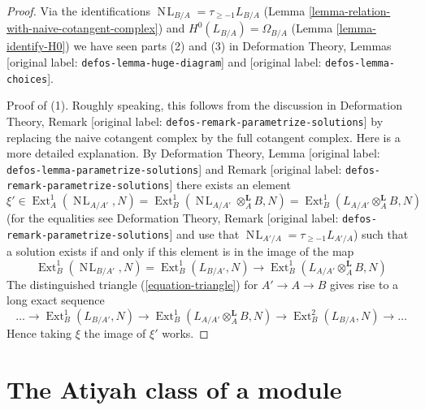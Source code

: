 \documentclass[10pt,a4paper]{article}
\theoremstyle{plain}
\theoremstyle{definition}
\theoremstyle{remark}
\numberwithin{equation}{subsection}
\def\Ext{\mathop{\mathrm{Ext}}\nolimits}
\def\NL{\mathop{N\!L}\nolimits}
\begin{document}
\begin{proof}
Via the identifications $\NL_{B/A} = \tau_{\geq -1}L_{B/A}$
(Lemma \ref{lemma-relation-with-naive-cotangent-complex}) and
$H^0(L_{B/A}) = \Omega_{B/A}$ (Lemma \ref{lemma-identify-H0})
we have seen parts (2) and (3) in
Deformation Theory, Lemmas \textnormal{[original label: \nolinkurl{defos-lemma-huge-diagram}]} and
\textnormal{[original label: \nolinkurl{defos-lemma-choices}]}.

\medskip\noindent
Proof of (1). Roughly speaking, this follows from the discussion in 
Deformation Theory, Remark \textnormal{[original label: \nolinkurl{defos-remark-parametrize-solutions}]}
by replacing the naive cotangent complex by the full cotangent complex.
Here is a more detailed explanation. By
Deformation Theory, Lemma \textnormal{[original label: \nolinkurl{defos-lemma-parametrize-solutions}]}
and Remark \textnormal{[original label: \nolinkurl{defos-remark-parametrize-solutions}]}
there exists an element
$$
\xi' \in
\Ext^1_A(\NL_{A/A'}, N) =
\Ext^1_B(\NL_{A/A'} \otimes_A^\mathbf{L} B, N) =
\Ext^1_B(L_{A/A'} \otimes_A^\mathbf{L} B, N)
$$
(for the equalities see Deformation Theory, Remark
\textnormal{[original label: \nolinkurl{defos-remark-parametrize-solutions}]} and use that
$\NL_{A'/A} = \tau_{\geq -1} L_{A'/A}$)
such that a solution exists if and only if this element is in
the image of the map
$$
\Ext^1_B(\NL_{B/A'}, N) = \Ext^1_B(L_{B/A'}, N)
\longrightarrow
\Ext^1_B(L_{A/A'} \otimes_A^\mathbf{L} B, N)
$$
The distinguished triangle (\ref{equation-triangle})
for $A' \to A \to B$ gives rise to a long exact sequence
$$
\ldots \to
\Ext^1_B(L_{B/A'}, N) \to
\Ext^1_B(L_{A/A'} \otimes_A^\mathbf{L} B, N) \to
\Ext^2_B(L_{B/A}, N) \to \ldots
$$
Hence taking $\xi$ the image of $\xi'$ works.
\end{proof}





\section{The Atiyah class of a module}
\label{section-atiyah}
\end{document}

